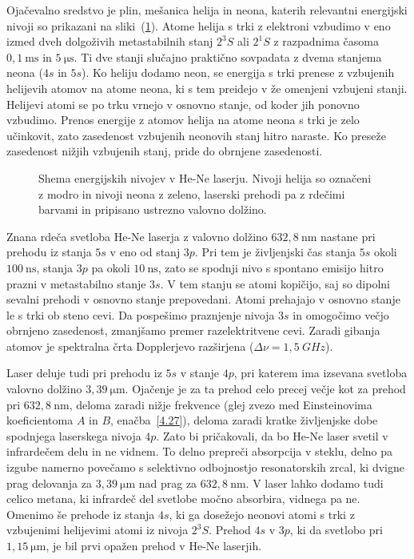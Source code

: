 Ojačevalno sredstvo je plin, mešanica helija in neona, katerih relevantni
energijski nivoji so prikazani na sliki~(\ref{fig:HeNeE}). 
Atome helija
s trki z elektroni vzbudimo v eno izmed dveh dolgoživih metastabilnih stanj $2^3S$ ali
$2^1S$ z razpadnima časoma $0,1~\si{\milli\second}$ in $5~\si{\micro\second}$.
Ti dve stanji slučajno praktično sovpadata z dvema stanjema neona ($4s$ in $5s$). 
Ko heliju dodamo neon, se energija s trki 
prenese z vzbujenih helijevih atomov na atome neona, ki s tem preidejo v 
že omenjeni vzbujeni stanji. Helijevi atomi se po trku vrnejo v osnovno stanje, od koder
jih ponovno vzbudimo. Prenos energije z atomov helija na atome neona s trki je 
zelo učinkovit, zato zasedenost vzbujenih neonovih stanj hitro naraste. Ko preseže 
zasedenost nižjih vzbujenih stanj, pride do obrnjene zasedenosti. 

\begin{figure}[h]
\centering
\def\svgwidth{100truemm} 

\caption{Shema energijskih nivojev v He-Ne laserju. Nivoji helija so označeni
z modro in nivoji neona z zeleno, laserski prehodi pa z rdečimi barvami in pripisano
ustrezno valovno dolžino.}
\label{fig:HeNeE}
\end{figure}

Znana rdeča svetloba He-Ne laserja z valovno dolžino $632,8~\si{\nano\metre}$ nastane 
pri prehodu iz stanja $5s$ v eno od stanj $3p$. Pri tem je življenjski čas 
stanja $5s$ okoli $100~\si{\nano\second}$, stanja $3p$ pa okoli $10~\si{\nano\second}$, zato
se spodnji nivo s spontano emisijo hitro prazni v metastabilno stanje $3s$. 
V tem stanju se atomi kopičijo, saj so dipolni sevalni prehodi v osnovno stanje prepovedani.
Atomi prehajajo v osnovno stanje le s trki ob steno cevi. Da pospešimo
praznjenje nivoja $3s$ in omogočimo večjo obrnjeno zasedenost, zmanjšamo 
premer razelektritvene cevi. Zaradi gibanja atomov je spektralna 
črta Dopplerjevo razširjena ($\Delta \nu = 1,5~\si{GHz}$). 

Laser deluje tudi pri prehodu iz $5s$ v stanje $4p$, pri katerem 
ima izsevana svetloba valovno dolžino $3,39~\si{\micro\metre}$. 
Ojačenje je za ta prehod celo precej večje kot za
prehod pri $632,8~\si{\nano\metre}$, deloma zaradi nižje frekvence 
(glej zvezo med Einsteinovima koeficientoma $A$ in $B$, enačba~\ref{4.27}), 
deloma zaradi kratke življenjske dobe spodnjega laserskega nivoja $4p$. 
Zato bi pričakovali, da bo He-Ne laser svetil v infrardečem delu in ne vidnem. 
To delno prepreči absorpcija v steklu, delno pa izgube namerno povečamo s selektivno odbojnostjo
resonatorskih zrcal, ki dvigne prag delovanja za $3,39~\si{\micro\metre}$ 
nad prag za $632,8~\si{\nano\metre}$. V laser lahko dodamo tudi
celico metana, ki infrardeč del svetlobe močno absorbira, vidnega pa ne.
Omenimo še prehode iz stanja $4s$, ki ga dosežejo neonovi atomi s trki
z vzbujenimi helijevimi atomi iz nivoja $2^3S$. Prehod $4s$ v $3p$, ki da svetlobo
pri $1,15~\si{\micro\metre}$, je bil prvi opažen prehod v He-Ne laserjih.

